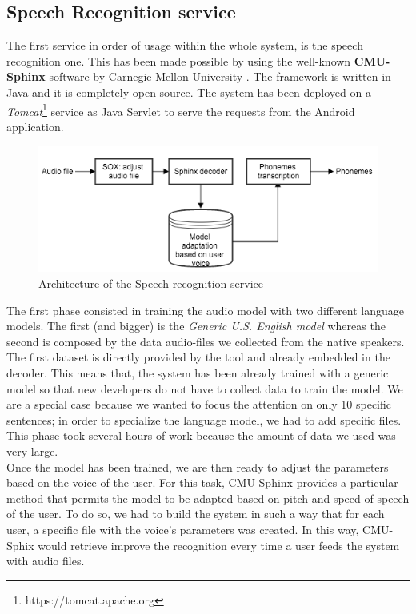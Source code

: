 \subsection{Speech Recognition service}
\label{ssec:training_sr_model}

The first service in order of usage within the whole system, is the speech recognition one. This has been made possible by using the well-known \textbf{CMU-Sphinx} software by Carnegie Mellon University \cite{walker2004sphinx}. The framework is written in Java and it is completely open-source. The system has been deployed on a \textit{Tomcat}\footnote{https://tomcat.apache.org} service as Java Servlet to serve the requests from the Android application. \\

\begin{figure}[!ht]
	\centering
	\includegraphics[scale=0.6]{Figures/sphinx_service.png}
	\caption{Architecture of the Speech recognition service}
	\label{fig:sphinx_service}
\end{figure}

\noindent The first phase consisted in training the audio model with two different language models. The first (and bigger) is the \textit{Generic U.S. English model} whereas the second is composed by the data audio-files we collected from the native speakers. The first dataset is directly provided by the tool and already embedded in the decoder. This means that, the system has been already trained with a generic model so that new developers do not have to collect data to train the model. We are a special case because we wanted to focus the attention on only 10 specific sentences; in order to specialize the language model, we had to add specific files. This phase took several hours of work because the amount of data we used was very large. \\

\noindent Once the model has been trained, we are then ready to adjust the parameters based on the voice of the user. For this task, CMU-Sphinx provides a particular method that permits the model to be adapted based on pitch and speed-of-speech of the user. To do so, we had to build the system in such a way that for each user, a specific file with the voice's parameters was created. In this way, CMU-Sphix would retrieve improve the recognition every time a user feeds the system with audio files. \\


